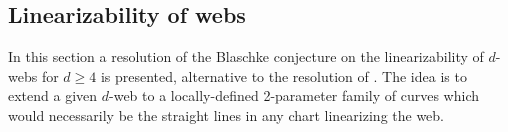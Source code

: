 \documentclass[12pt]{article}
\numberwithin{equation}{section}
\theoremstyle{plain}
\theoremstyle{definition}
\renewcommand{\P}{\mathbb{P}}
\begin{document}
\subsection{Linearizability of webs}\label{linwebs}


In this section a resolution of the Blaschke conjecture on the linearizability of $d$-webs for $d\geq 4$ is presented, alternative to the resolution of \cite{lychagin4webs}. The idea is to extend a given $d$-web to a locally-defined 2-parameter family of curves which would necessarily be the straight lines in any chart linearizing the web.
\end{document}
